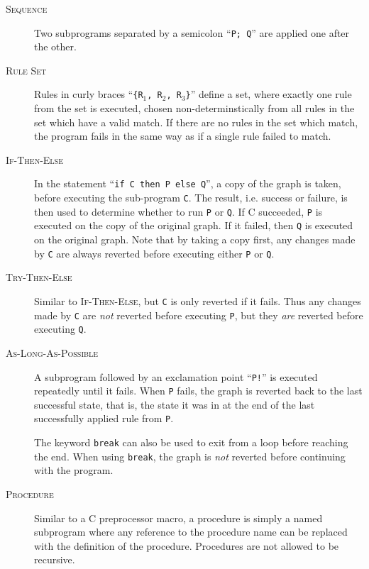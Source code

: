 \documentclass[authoryearcitations]{UoYCSproject}
\begin{document}
\begin{description}
    \item[\textsc{Sequence}]
    Two subprograms separated by a semicolon ``\texttt{P; Q}'' are applied
    one after the other.

    \item[\textsc{Rule Set}]
    Rules in curly braces ``\texttt{\{R$_{\text{1}}$, R$_{\text{2}}$, R$_{\text{3}}$\}}''
    define a set, where exactly one rule from the set is executed, chosen
    non-determinstically from all rules in the set which have a valid match.
    If there are no rules in the set which match, the program fails in the
    same way as if a single rule failed to match.

    \item[\textsc{If-Then-Else}]
    In the statement ``\texttt{if C then P else Q}'', a copy of the graph is taken,
    before executing the sub-program \texttt{C}. The result, i.e. success or failure,
    is then used to determine whether to run \texttt{P} or \texttt{Q}. If C succeeded,
    \texttt{P} is executed on the copy of the original graph. If it failed, then
    \texttt{Q} is executed on the original graph. Note that by taking a copy first,
    any changes made by \texttt{C} are always reverted before executing either
    \texttt{P} or \texttt{Q}.

    \item[\textsc{Try-Then-Else}]
    Similar to \textsc{If-Then-Else}, but \texttt{C} is only reverted if it fails.
    Thus any changes made by \texttt{C} are \emph{not} reverted before executing
    \texttt{P}, but they \emph{are} reverted before executing \texttt{Q}.

    \item[\textsc{As-Long-As-Possible}]
    A subprogram followed by an exclamation point ``\texttt{P!}'' is executed
    repeatedly until it fails. When \texttt{P} fails, the graph is reverted back
    to the last successful state, that is, the state it was in at the end of the
    last successfully applied rule from \texttt{P}.

    The keyword \texttt{break} can also be used to exit from a loop before reaching
    the end. When using \texttt{break}, the graph is \emph{not} reverted before
    continuing with the program.

    \item[\textsc{Procedure}]
    Similar to a C preprocessor macro, a procedure is simply a named subprogram
    where any reference to the procedure name can be replaced with the definition
    of the procedure. Procedures are not allowed to be recursive.


\end{description}
\end{document}
